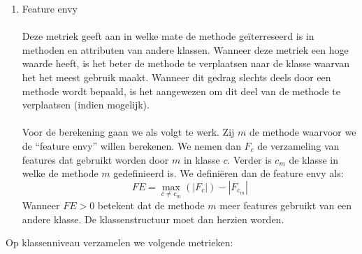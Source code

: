 \begin{enumerate}
	\item 
		Feature envy
		\\
		\\
		Deze metriek geeft aan in welke mate de methode ge\"{i}terreseerd is in methoden en attributen van andere klassen. Wanneer deze metriek een hoge waarde heeft, is het beter de methode te verplaatsen naar de klasse waarvan het het meest gebruik maakt. Wanneer dit gedrag slechts deels door een methode wordt bepaald, is het aangewezen om dit deel van de methode te verplaatsen (indien mogelijk).
		\\
		\\
		Voor de berekening gaan we als volgt te werk. Zij $m$ de methode waarvoor we de ``feature envy'' willen berekenen. We nemen dan $F_{c}$ de verzameling van features dat gebruikt worden door $m$ in klasse $c$. Verder is $c_{m}$ de klasse in welke de methode $m$ gedefinieerd is. We defini\"{e}ren dan de feature envy als:
		$$ FE = \max_{c \neq c_{m}} (|F_{c}|) - |F_{c_{m}}| $$
		Wanneer $FE > 0$ betekent dat de methode $m$ meer features gebruikt van een andere klasse. De klassenstructuur moet dan herzien worden. 

\end{enumerate}
Op klassenniveau verzamelen we volgende metrieken:
